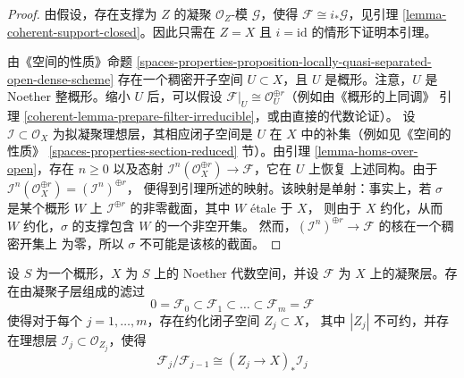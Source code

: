 \begin{proof}
由假设，存在支撑为 $Z$ 的凝聚 $\mathcal{O}_Z$-模 $\mathcal{G}$，使得
$\mathcal{F} \cong i_*\mathcal{G}$，见引理
\ref{lemma-coherent-support-closed}。因此只需在 $Z = X$ 且
$i = \text{id}$ 的情形下证明本引理。

\medskip\noindent
由《空间的性质》命题
\ref{spaces-properties-proposition-locally-quasi-separated-open-dense-scheme}
存在一个稠密开子空间 $U \subset X$，且 $U$ 是概形。注意，$U$ 是 Noether
整概形。缩小 $U$ 后，可以假设
$\mathcal{F}|_U \cong \mathcal{O}_U^{\oplus r}$（例如由《概形的上同调》
引理 \ref{coherent-lemma-prepare-filter-irreducible}，或由直接的代数论证）。
设 $\mathcal{I} \subset \mathcal{O}_X$ 为拟凝聚理想层，其相应闭子空间是
$U$ 在 $X$ 中的补集（例如见《空间的性质》
\ref{spaces-properties-section-reduced} 节）。由引理
\ref{lemma-homs-over-open}，存在 $n \geq 0$ 以及态射
$\mathcal{I}^n(\mathcal{O}_X^{\oplus r}) \to \mathcal{F}$，它在 $U$ 上恢复
上述同构。由于
$\mathcal{I}^n(\mathcal{O}_X^{\oplus r}) = (\mathcal{I}^n)^{\oplus r}$，
便得到引理所述的映射。该映射是单射：事实上，若 $\sigma$ 是某个概形
$W$ 上 $\mathcal{I}^{\oplus r}$ 的非零截面，其中 $W$ \'etale 于 $X$，
则由于 $X$ 约化，从而 $W$ 约化，$\sigma$ 的支撑包含 $W$ 的一个非空开集。
然而，$(\mathcal{I}^n)^{\oplus r} \to \mathcal{F}$ 的核在一个稠密开集上
为零，所以 $\sigma$ 不可能是该核的截面。
\end{proof}

\begin{lemma}
\label{lemma-coherent-filter}
设 $S$ 为一个概形，$X$ 为 $S$ 上的 Noether 代数空间，并设 $\mathcal{F}$
为 $X$ 上的凝聚层。存在由凝聚子层组成的滤过
$$
0 = \mathcal{F}_0 \subset \mathcal{F}_1 \subset
\ldots \subset \mathcal{F}_m = \mathcal{F}
$$
使得对于每个 $j = 1, \ldots, m$，存在约化闭子空间 $Z_j \subset X$，
其中 $|Z_j|$ 不可约，并存在理想层
$\mathcal{I}_j \subset \mathcal{O}_{Z_j}$，使得
$$
\mathcal{F}_j/\mathcal{F}_{j - 1}
\cong (Z_j \to X)_* \mathcal{I}_j
$$
\end{lemma}

